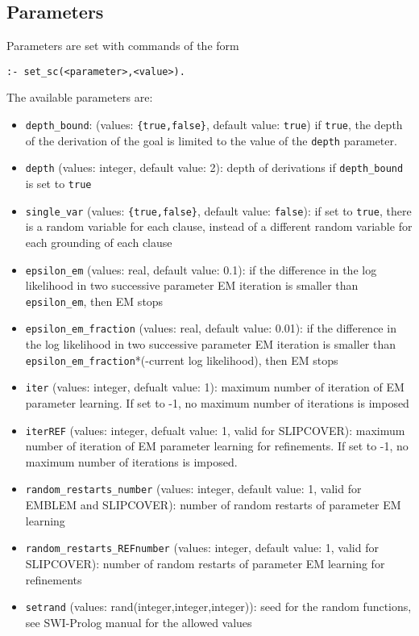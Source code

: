 \documentclass[a4paper,10pt]{article}
\begin{document}
\subsection{Parameters}
Parameters are set with  commands of the form
\begin{verbatim}
:- set_sc(<parameter>,<value>).
\end{verbatim}
The available parameters are:
\begin{itemize}
\item \verb|depth_bound|: (values: \verb|{true,false}|,  default value: \texttt{true}) if \texttt{true}, the depth of the derivation of the goal is limited to the value of the \texttt{depth} parameter. 
\item \verb|depth| (values: integer, default value: 2): depth of derivations if  \verb|depth_bound|  is set to \verb|true|
\item \verb|single_var| (values: \verb|{true,false}|, default value: \verb|false|): if set to \verb|true|, there is a random variable for each clause, instead of a different random variable for each grounding of each clause
\item \verb|epsilon_em| (values: real, default value: 0.1): if the difference in the log likelihood in two successive parameter EM iteration is smaller
than \verb|epsilon_em|, then EM stops 
\item \verb|epsilon_em_fraction| (values: real, default value: 0.01): if the difference in the log likelihood in two successive parameter EM iteration is smaller
than \verb|epsilon_em_fraction|*(-current log likelihood), then EM stops
\item \verb|iter| (values: integer, defualt value: 1): maximum number of iteration of EM parameter learning. If set to -1, no maximum number of iterations is imposed
\item \verb|iterREF| (values: integer, defualt value: 1, valid for  
 SLIPCOVER):
 maximum number of iteration of EM parameter learning for refinements. If set to -1, no maximum number of iterations is imposed.
\item \verb|random_restarts_number| (values: integer, default value: 1, valid for EMBLEM and SLIPCOVER): number of random restarts of parameter EM learning
\item \verb|random_restarts_REFnumber| (values: integer, default value: 1, valid for  SLIPCOVER): number of random restarts of parameter EM learning for refinements
\item \verb|setrand| (values: rand(integer,integer,integer)): seed for the random functions, see SWI-Prolog manual for the allowed values

\end{itemize}
\end{document}
